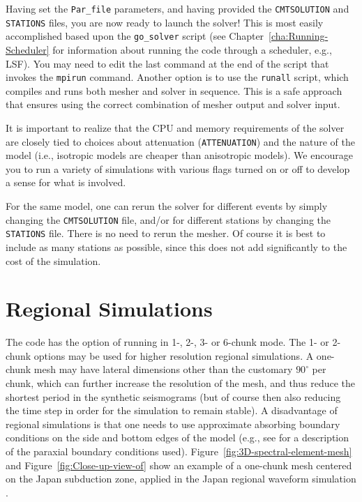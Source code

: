 \documentclass[oneside,english]{book}
\begin{document}
Having set the \texttt{Par\_file} parameters, and having provided
the \texttt{CMTSOLUTION} and \texttt{STATIONS} files, you are now
ready to launch the solver! This is most easily accomplished based
upon the \texttt{go\_solver} script (see Chapter~\ref{cha:Running-Scheduler}
for information about running the code through a scheduler, e.g.,
LSF). You may need to edit the last command at the end of the script
that invokes the \texttt{mpirun} command. Another option is to use
the \texttt{runall} script, which compiles and runs both mesher and
solver in sequence. This is a safe approach that ensures using the
correct combination of mesher output and solver input.

It is important to realize that the CPU and memory requirements of
the solver are closely tied to choices about attenuation (\texttt{ATTENUATION})
and the nature of the model (i.e., isotropic models are cheaper than
anisotropic models). We encourage you to run a variety of simulations
with various flags turned on or off to develop a sense for what is
involved.

For the same model, one can rerun the solver for different events
by simply changing the \texttt{CMTSOLUTION} file, and/or for different
stations by changing the \texttt{STATIONS} file. There is no need
to rerun the mesher. Of course it is best to include as many stations
as possible, since this does not add significantly to the cost of
the simulation.


\chapter{\label{cha:Regional-Simulations}Regional Simulations}

The code has the option of running in 1-, 2-, 3- or 6-chunk mode.
The 1- or 2-chunk options may be used for higher resolution regional
simulations. A one-chunk mesh may have lateral dimensions other than
the customary $90^{\circ}$ per chunk, which can further increase
the resolution of the mesh, and thus reduce the shortest period in
the synthetic seismograms (but of course then also reducing the time
step in order for the simulation to remain stable). A disadvantage
of regional simulations is that one needs to use approximate absorbing
boundary conditions on the side and bottom edges of the model (e.g.,
see \citet{KoTr99} for a description of the paraxial boundary conditions
used). Figure~\vref{fig:3D-spectral-element-mesh} and Figure~\vref{fig:Close-up-view-of}
show an example of a one-chunk mesh centered on the Japan subduction
zone, applied in the Japan regional waveform simulation \citep{ChTrHeKa07}.
\end{document}
